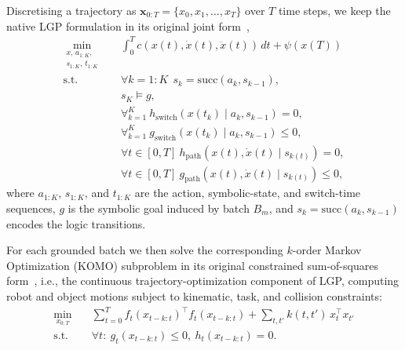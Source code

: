 \documentclass[journal]{IEEEtran}
\begin{document}
Discretising a trajectory as $\mathbf{x}_{0:T}=\{x_0,x_1,\dots,x_T\}$ over
$T$ time steps, we keep the native LGP formulation in its original joint
form~\cite{cite_lgp_2015},
\begin{align}
\min_{\substack{x,\,a_{1:K},\\ s_{1:K},\,t_{1:K}}}\quad
&\int_0^T c\!\left(x(t),\dot{x}(t),\ddot{x}(t)\right)\,dt + \psi\!\left(x(T)\right)
\label{eq:lgp_obj}\\
\text{s.t.}\quad
&\forall k=1{:}K\ \ s_k = \mathrm{succ}(a_k, s_{k-1}),
\label{eq:lgp_succ}\\
&s_K\models g,
\label{eq:lgp_goal}\\
&\forall_{k=1}^{K}\ h_{\mathrm{switch}}\!\left(x(t_k)\mid a_k,s_{k-1}\right)=0,
\label{eq:lgp_sweq}\\
&\forall_{k=1}^{K}\ g_{\mathrm{switch}}\!\left(x(t_k)\mid a_k,s_{k-1}\right)\le 0,
\label{eq:lgp_swineq}\\
&\forall t\in[0,T]\ h_{\mathrm{path}}\!\left(x(t),\dot{x}(t)\mid s_{k(t)}\right)=0,
\label{eq:lgp_patheq}\\
&\forall t\in[0,T]\ g_{\mathrm{path}}\!\left(x(t),\dot{x}(t)\mid s_{k(t)}\right)\le 0,
\label{eq:lgp_pathineq}
\end{align}
where $a_{1:K}$, $s_{1:K}$, and $t_{1:K}$ are the action, symbolic-state, and
switch-time sequences, $g$ is the symbolic goal induced by batch $B_m$, and
$s_k=\mathrm{succ}(a_k,s_{k-1})$ encodes the logic transitions.

For each grounded batch we then solve the corresponding $k$-order Markov
Optimization (KOMO) subproblem in its original constrained sum-of-squares
form~\cite{cite_komo_2014}, i.e., the continuous trajectory-optimization
component of LGP, computing robot and object motions subject to kinematic,
task, and collision constraints:
\begin{align}
\min_{x_{0:T}}\quad
&\sum_{t=0}^{T} f_t\!\left(x_{t-k:t}\right)^\top f_t\!\left(x_{t-k:t}\right)
+\sum_{t,t'} k(t,t')\,x_t^\top x_{t'}
\label{eq:komo}\\
\text{s.t.}\quad
&\forall t:\ g_t\!\left(x_{t-k:t}\right)\le 0,\ h_t\!\left(x_{t-k:t}\right)=0.
\label{eq:komo_c}
\end{align}
\end{document}
